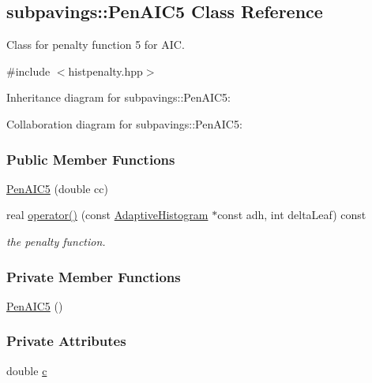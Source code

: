 \hypertarget{classsubpavings_1_1PenAIC5}{\subsection{subpavings\-:\-:\-Pen\-A\-I\-C5 \-Class \-Reference}
\label{classsubpavings_1_1PenAIC5}
}


\-Class for penalty function 5 for \-A\-I\-C.  




{\ttfamily \#include $<$histpenalty.\-hpp$>$}



\-Inheritance diagram for subpavings\-:\-:\-Pen\-A\-I\-C5\-:


\-Collaboration diagram for subpavings\-:\-:\-Pen\-A\-I\-C5\-:
\subsubsection*{\-Public \-Member \-Functions}
\begin{DoxyCompactItemize}
\item 
\hyperlink{classsubpavings_1_1PenAIC5_a2af1dc5c15afa9cce645020ffc915486}{\-Pen\-A\-I\-C5} (double cc)
\item 
real \hyperlink{classsubpavings_1_1PenAIC5_a979f8bcd09ee325303b4ca0db5c51d8c}{operator()} (const \hyperlink{classsubpavings_1_1AdaptiveHistogram}{\-Adaptive\-Histogram} $\ast$const adh, int delta\-Leaf) const 
\begin{DoxyCompactList}\small\item\em the penalty function. \end{DoxyCompactList}\end{DoxyCompactItemize}
\subsubsection*{\-Private \-Member \-Functions}
\begin{DoxyCompactItemize}
\item 
\hyperlink{classsubpavings_1_1PenAIC5_a0a4d730142d97407ad956266c828b683}{\-Pen\-A\-I\-C5} ()
\end{DoxyCompactItemize}
\subsubsection*{\-Private \-Attributes}
\begin{DoxyCompactItemize}
\item 
double \hyperlink{classsubpavings_1_1PenAIC5_a778ca6554c74be689f388fe3e61c99c7}{c}
\end{DoxyCompactItemize}


